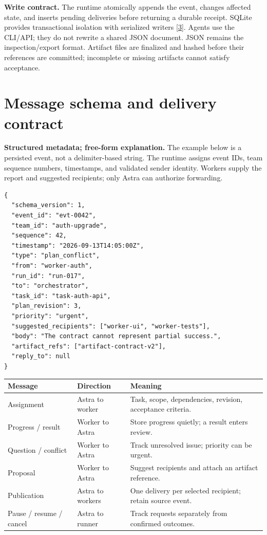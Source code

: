 \documentclass[11pt,letterpaper]{article}
\begin{document}
\textbf{Write contract.} The runtime atomically appends the event, changes affected
state, and inserts pending deliveries before returning a durable receipt. SQLite
provides transactional isolation with serialized writers [\hyperref[s3]{3}].
Agents use the CLI/API; they do not rewrite a shared JSON document. JSON remains
the inspection/export format. Artifact files are finalized and hashed before their
references are committed; incomplete or missing artifacts cannot satisfy acceptance.

\clearpage
\section*{Message schema and delivery contract}
\textbf{Structured metadata; free-form explanation.} The example below is a
persisted event, not a delimiter-based string. The runtime assigns event IDs,
team sequence numbers, timestamps, and validated sender identity. Workers supply
the report and suggested recipients; only Astra can authorize forwarding.

\begin{lstlisting}
{
  "schema_version": 1,
  "event_id": "evt-0042",
  "team_id": "auth-upgrade",
  "sequence": 42,
  "timestamp": "2026-09-13T14:05:00Z",
  "type": "plan_conflict",
  "from": "worker-auth",
  "run_id": "run-017",
  "to": "orchestrator",
  "task_id": "task-auth-api",
  "plan_revision": 3,
  "priority": "urgent",
  "suggested_recipients": ["worker-ui", "worker-tests"],
  "body": "The contract cannot represent partial success.",
  "artifact_refs": ["artifact-contract-v2"],
  "reply_to": null
}
\end{lstlisting}

\begin{tabularx}{\linewidth}{@{}>{\raggedright\arraybackslash}p{32mm}>{\raggedright\arraybackslash}p{31mm}Y@{}}
\toprule\textbf{Message} & \textbf{Direction} & \textbf{Meaning}\\\midrule
Assignment & Astra to worker & Task, scope, dependencies, revision, acceptance criteria.\\
Progress / result & Worker to Astra & Store progress quietly; a result enters review.\\
Question / conflict & Worker to Astra & Track unresolved issue; priority can be urgent.\\
Proposal & Worker to Astra & Suggest recipients and attach an artifact reference.\\
Publication & Astra to workers & One delivery per selected recipient; retain source event.\\
Pause / resume / cancel & Astra to runner & Track requests separately from confirmed outcomes.\\
\bottomrule
\end{tabularx}
\end{document}
